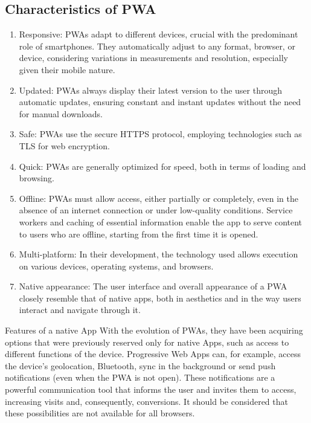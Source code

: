 \documentclass[12pt,a4paper, twosite]{article}
\begin{document}
	\subsection{Characteristics of PWA}
	\label{sec:product-perspective}
	
\begin{enumerate}
	\item Responsive: PWAs adapt to different devices, crucial with the predominant role of smartphones. They automatically adjust to any format, browser, or device, considering variations in measurements and resolution, especially given their mobile nature.
	
	\item Updated: PWAs always display their latest version to the user through automatic updates, ensuring constant and instant updates without the need for manual downloads.
	
	\item Safe: PWAs use the secure HTTPS protocol, employing technologies such as TLS for web encryption.
	
	\item Quick: PWAs are generally optimized for speed, both in terms of loading and browsing.
	
	\item Offline: PWAs must allow access, either partially or completely, even in the absence of an internet connection or under low-quality conditions. Service workers and caching of essential information enable the app to serve content to users who are offline, starting from the first time it is opened.
	
	\item Multi-platform: In their development, the technology used allows execution on various devices, operating systems, and browsers.
	
	\item Native appearance: The user interface and overall appearance of a PWA closely resemble that of native apps, both in aesthetics and in the way users interact and navigate through it.
\end{enumerate}
	Features of a native App
	With the evolution of PWAs, they have been acquiring options that were previously reserved only for native Apps, such as access to different functions of the device.
	Progressive Web Apps can, for example, access the device's geolocation, Bluetooth, sync in the background or send push notifications (even when the PWA is not open). These notifications are a powerful communication tool that informs the user and invites them to access, increasing visits and, consequently, conversions. It should be considered that these possibilities are not available for all browsers.
\end{document}
